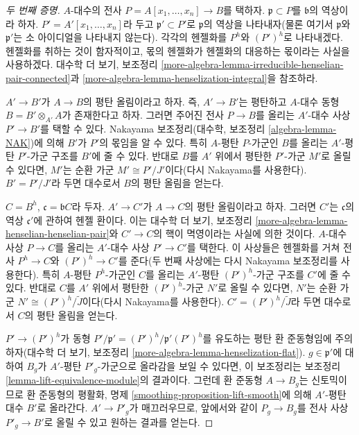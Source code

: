 \begin{proof}[두 번째 증명]
$A$-대수의 전사 $P = A[x_1, \ldots, x_n] \to B$를 택하자.
$\mathfrak p \subset P$를 $\mathfrak b$의 역상이라 하자.
$P' = A'[x_1, \ldots, x_n]$라 두고 $\mathfrak p' \subset P'$로
$\mathfrak p$의 역상을 나타내자(물론 여기서 $\mathfrak p$와
$\mathfrak p'$는 소 아이디얼을 나타내지 않는다). 각각의 헨젤화를
$P^h$와 $(P')^h$로 나타내겠다. 헨젤화를 취하는 것이 함자적이고, 몫의
헨젤화가 헨젤화의 대응하는 몫이라는 사실을 사용하겠다. 대수학 더 보기,
보조정리 \ref{more-algebra-lemma-irreducible-henselian-pair-connected}과
\ref{more-algebra-lemma-henselization-integral}을 참조하라.

\medskip\noindent
$A' \to B'$가 $A \to B$의 평탄 올림이라고 하자. 즉,
$A' \to B'$는 평탄하고 $A$-대수 동형 $B = B' \otimes_{A'} A$가
존재한다고 하자. 그러면 주어진 전사 $P \to B$를 올리는 $A'$-대수
사상 $P' \to B'$를 택할 수 있다. Nakayama 보조정리(대수학, 보조정리
\ref{algebra-lemma-NAK})에 의해 $B'$가 $P'$의 몫임을 알 수 있다.
특히 $A$-평탄 $P$-가군인 $B$를 올리는 $A'$-평탄 $P'$-가군 구조를
$B'$에 줄 수 있다. 반대로 $B$를 $A'$ 위에서 평탄한 $P'$-가군 $M'$로
올릴 수 있다면, $M'$는 순환 가군 $M' \cong P'/J'$이다(다시 Nakayama를
사용한다). $B' = P'/J'$라 두면 대수로서 $B$의 평탄 올림을 얻는다.

\medskip\noindent
$C = B^h$, $\mathfrak c = \mathfrak bC$라 두자. $A' \to C'$가
$A \to C$의 평탄 올림이라고 하자. 그러면 $C'$는 $\mathfrak c$의 역상
$\mathfrak c'$에 관하여 헨젤 환이다. 이는 대수학 더 보기, 보조정리
\ref{more-algebra-lemma-henselian-henselian-pair}와 $C' \to C$의 핵이
멱영이라는 사실에 의한 것이다. $A$-대수 사상 $P \to C$를 올리는
$A'$-대수 사상 $P' \to C'$를 택한다. 이 사상들은 헨젤화를 거쳐 전사
$P^h \to C$와 $(P')^h \to C'$를 준다(두 번째 사상에는 다시 Nakayama
보조정리를 사용한다). 특히 $A$-평탄 $P^h$-가군인 $C$를 올리는
$A'$-평탄 $(P')^h$-가군 구조를 $C'$에 줄 수 있다. 반대로 $C$를
$A'$ 위에서 평탄한 $(P')^h$-가군 $N'$로 올릴 수 있다면, $N'$는 순환
가군 $N' \cong (P')^h/\tilde J$이다(다시 Nakayama를 사용한다).
$C' = (P')^h/\tilde J$라 두면 대수로서 $C$의 평탄 올림을 얻는다.

\medskip\noindent
$P' \to (P')^h$가 동형
$P'/\mathfrak p' = (P')^h/\mathfrak p'(P')^h$를 유도하는 평탄 환
준동형임에 주의하자(대수학 더 보기, 보조정리
\ref{more-algebra-lemma-henselization-flat}). $g \in \mathfrak p'$에 대하여
$B_g$가 $A'$-평탄 $P'_g$-가군으로 올라감을 보일 수 있다면, 이 보조정리는
보조정리 \ref{lemma-lift-equivalence-module}의 결과이다. 그런데 환 준동형
$A \to B_g$는 신토믹이므로 환 준동형의 평활화, 명제
\ref{smoothing-proposition-lift-smooth}에 의해 $A'$-평탄 대수 $B'$로
올라간다. $A' \to P'_g$가 매끄러우므로, 앞에서와 같이
$P_g \to B_g$를 전사 사상 $P'_g \to B'$로 올릴 수 있고 원하는 결과를
얻는다.
\end{proof}

